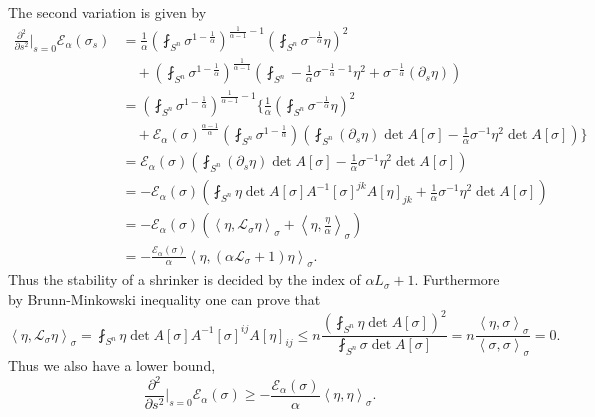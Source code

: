 \documentclass[12pt,a4paper]{article}
\begin{document}
The second variation is given by \begin{align*}
   \frac{\partial^{2}}{\partial s^{2}}\bigg|_{s=0} \mathcal{E}_{\alpha}(\sigma_{s}) & = \frac{1}{\alpha}\left( \fint_{S^{n}} \sigma^{1- \frac{1}{\alpha}} \right)^{\frac{1}{\alpha-1}-1} \left( \fint_{S^{n}}\sigma^{-\frac{1}{\alpha}}\eta \right)^{2} \\
   & \quad + \left( \fint_{S^{n}} \sigma^{1-\frac{1}{\alpha}} \right)^{\frac{1}{\alpha-1}} \left( \fint_{S^{n}}-\frac{1}{\alpha} \sigma^{-\frac{1}{\alpha}-1}\eta^{2}+ \sigma^{-\frac{1}{\alpha}}(\partial_{s}\eta) \right) \\
   & = \left( \fint_{S^{n}}\sigma^{1- \frac{1}{\alpha}} \right)^{\frac{1}{\alpha-1}-1} \biggl\{\frac{1}{\alpha}\left( \fint_{S^{n}}\sigma^{-\frac{1}{\alpha}}\eta \right)^{2}\\
   & \quad + \mathcal{E}_{\alpha}(\sigma)^{\frac{\alpha-1}{\alpha}}\left(\fint_{S^{n}} \sigma^{1-\frac{1}{\alpha}} \right) \left( \fint_{S^{n}}(\partial_{s}\eta)\det A[\sigma] - \frac{1}{\alpha}\sigma^{-1}\eta^{2}\det A[\sigma] \right) \biggr\} \\
   & = \mathcal{E}_{\alpha}(\sigma)\left( \fint_{S^{n}}(\partial_{s}\eta)\det A[\sigma] - \frac{1}{\alpha}\sigma^{-1}\eta^{2}\det A[\sigma] \right) \\
   & = - \mathcal{E}_{\alpha}(\sigma) \left( \fint_{S^{n}}\eta \det A[\sigma]A^{-1}[\sigma]^{jk}A[\eta]_{jk} + \frac{1}{\alpha}\sigma^{-1}\eta^{2}\det A[\sigma] \right) \\
   & = - \mathcal{E}_{\alpha}(\sigma) \left( \left< \eta, \mathcal{L}_{\sigma}\eta \right>_{\sigma} + \left< \eta, \frac{\eta}{\alpha} \right>_{\sigma} \right) \\
   & = - \frac{\mathcal{E}_{\alpha}(\sigma)}{\alpha}\left< \eta, (\alpha \mathcal{L}_{\sigma} + 1)\eta \right>_{\sigma}.
\end{align*}
Thus the stability of a shrinker is decided by the index of $ \alpha L_{\sigma}+ 1 $. Furthermore by Brunn-Minkowski inequality one can prove that 
\[ \left< \eta, \mathcal{L}_{\sigma} \eta \right>_{\sigma} = \fint_{S^{n}} \eta \det A[\sigma] A^{-1}[\sigma]^{ij}A[\eta]_{ij} \le n \frac{\left(\fint_{S^{n}} \eta \det A [\sigma] \right)^{2}}{\fint_{S^{n}}\sigma \det A[\sigma]} = n \frac{\left< \eta, \sigma \right>_{\sigma}}{\left< \sigma, \sigma \right>_{\sigma}} = 0. \]
Thus we also have a lower bound, 
\[ \frac{\partial^{2}}{\partial s^{2}}\bigg|_{s=0} \mathcal{E}_{\alpha}(\sigma) \ge - \frac{\mathcal{E}_{\alpha}(\sigma)}{\alpha} \left< \eta, \eta \right>_{\sigma}. \]
\end{document}
